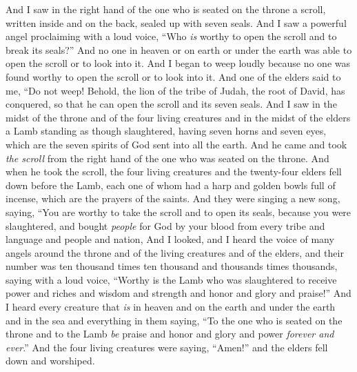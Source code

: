 \begin{biblechapter} %
 And I saw in the right hand of the one who is seated on the throne a scroll, written inside and on the back, sealed up with seven seals.
\verse And I saw a powerful angel proclaiming with a loud voice, “Who \textit{is} worthy to open the scroll and to break its seals?”
\verse And no one in heaven or on earth or under the earth was able to open the scroll or to look into it.
\verse And I began to weep loudly because no one was found worthy to open the scroll or to look into it.
\verse And one of the elders said to me, “Do not weep! Behold, the lion of the tribe of Judah, the root of David, has conquered, so that he can open the scroll and its seven seals.
\verse And I saw in the midst of the throne and of the four living creatures and in the midst of the elders a Lamb standing as though slaughtered, having seven horns and seven eyes, which are the seven spirits of God sent into all the earth.
\verse And he came and took \textit{the scroll} from the right hand of the one who was seated on the throne.
\verse And when he took the scroll, the four living creatures and the twenty-four elders fell down before the Lamb, each one of whom had a harp and golden bowls full of incense, which are the prayers of the saints.
\verse And they were singing a new song, saying,
\verse “You are worthy to take the scroll 
and to open its seals, 
because you were slaughtered, 
and bought \textit{people} for God by your blood 
from every tribe and language and people and nation,
\verse And I looked, and I heard the voice of many angels around the throne and of the living creatures and of the elders, and their number was ten thousand times ten thousand and thousands times thousands,
\verse saying with a loud voice, “Worthy is the Lamb who was slaughtered 
to receive power and riches 
and wisdom and strength 
and honor and glory and praise!”
\verse And I heard every creature that \textit{is} in heaven and on the earth and under the earth and in the sea and everything in them saying, “To the one who is seated on the throne and to the Lamb 
\textit{be} praise and honor and glory and power 
\textit{forever and ever}.”
\verse And the four living creatures were saying, “Amen!” and the elders fell down and worshiped.
\end{biblechapter}

